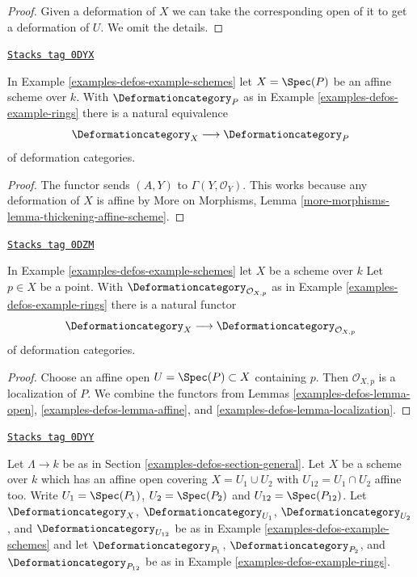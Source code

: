 \begin{proof}
Given a deformation of $X$ we can take the corresponding open
of it to get a deformation of $U$. We omit the details.
\end{proof}

\begin{lemma}[Affine]
\label{examples-defos-lemma-affine}
\href{https://stacks.math.columbia.edu/tag/0DYX}{\texttt{Stacks tag 0DYX}}

In Example \ref{examples-defos-example-schemes} let $X = \Spec(P)$ be an
affine scheme over $k$. With $\Deformationcategory_P$ as in
Example \ref{examples-defos-example-rings} there is a natural equivalence
$$
\Deformationcategory_X \longrightarrow \Deformationcategory_P
$$
of deformation categories.
\end{lemma}

\begin{proof}
The functor sends $(A, Y)$ to $\Gamma(Y, \mathcal{O}_Y)$.
This works because
any deformation of $X$ is affine by
More on Morphisms, Lemma \ref{more-morphisms-lemma-thickening-affine-scheme}.
\end{proof}

\begin{lemma}
\label{examples-defos-lemma-local-ring}
\href{https://stacks.math.columbia.edu/tag/0DZM}{\texttt{Stacks tag 0DZM}}

In Example \ref{examples-defos-example-schemes} let $X$ be a scheme over $k$
Let $p \in X$ be a point. With $\Deformationcategory_{\mathcal{O}_{X, p}}$
as in Example \ref{examples-defos-example-rings} there is a natural functor
$$
\Deformationcategory_X
\longrightarrow
\Deformationcategory_{\mathcal{O}_{X, p}}
$$
of deformation categories.
\end{lemma}

\begin{proof}
Choose an affine open $U = \Spec(P) \subset X$ containing $p$.
Then $\mathcal{O}_{X, p}$ is a localization of $P$. We combine
the functors from
Lemmas \ref{examples-defos-lemma-open}, \ref{examples-defos-lemma-affine}, and \ref{examples-defos-lemma-localization}.
\end{proof}

\begin{definition}
\label{examples-defos-situation-glueing}
\href{https://stacks.math.columbia.edu/tag/0DYY}{\texttt{Stacks tag 0DYY}}

Let $\Lambda \to k$ be as in Section \ref{examples-defos-section-general}.
Let $X$ be a scheme over $k$ which has an affine open covering
$X = U_1 \cup U_2$ with $U_{12} = U_1 \cap U_2$ affine too.
Write $U_1 = \Spec(P_1)$, $U_2 = \Spec(P_2)$ and $U_{12} = \Spec(P_{12})$.
Let $\Deformationcategory_X$, $\Deformationcategory_{U_1}$,
$\Deformationcategory_{U_2}$, and $\Deformationcategory_{U_{12}}$
be as in Example \ref{examples-defos-example-schemes} and let
$\Deformationcategory_{P_1}$, $\Deformationcategory_{P_2}$, and
$\Deformationcategory_{P_{12}}$ be as in Example \ref{examples-defos-example-rings}.
\end{definition}

